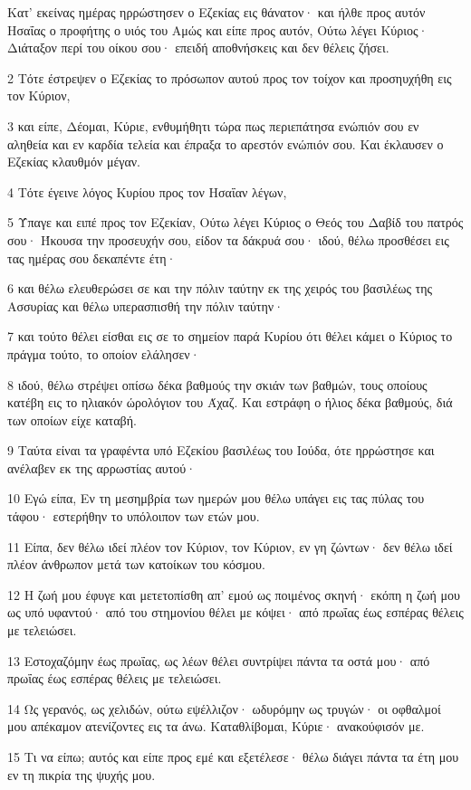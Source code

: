 \par Κατ' εκείνας ημέρας ηρρώστησεν ο Εζεκίας εις θάνατον· και ήλθε προς αυτόν Ησαΐας ο προφήτης ο υιός του Αμώς και είπε προς αυτόν, Ούτω λέγει Κύριος· Διάταξον περί του οίκου σου· επειδή αποθνήσκεις και δεν θέλεις ζήσει.
\par 2 Τότε έστρεψεν ο Εζεκίας το πρόσωπον αυτού προς τον τοίχον και προσηυχήθη εις τον Κύριον,
\par 3 και είπε, Δέομαι, Κύριε, ενθυμήθητι τώρα πως περιεπάτησα ενώπιόν σου εν αληθεία και εν καρδία τελεία και έπραξα το αρεστόν ενώπιόν σου. Και έκλαυσεν ο Εζεκίας κλαυθμόν μέγαν.
\par 4 Τότε έγεινε λόγος Κυρίου προς τον Ησαΐαν λέγων,
\par 5 Ύπαγε και ειπέ προς τον Εζεκίαν, Ούτω λέγει Κύριος ο Θεός του Δαβίδ του πατρός σου· Ήκουσα την προσευχήν σου, είδον τα δάκρυά σου· ιδού, θέλω προσθέσει εις τας ημέρας σου δεκαπέντε έτη·
\par 6 και θέλω ελευθερώσει σε και την πόλιν ταύτην εκ της χειρός του βασιλέως της Ασσυρίας και θέλω υπερασπισθή την πόλιν ταύτην·
\par 7 και τούτο θέλει είσθαι εις σε το σημείον παρά Κυρίου ότι θέλει κάμει ο Κύριος το πράγμα τούτο, το οποίον ελάλησεν·
\par 8 ιδού, θέλω στρέψει οπίσω δέκα βαθμούς την σκιάν των βαθμών, τους οποίους κατέβη εις το ηλιακόν ώρολόγιον του Άχαζ. Και εστράφη ο ήλιος δέκα βαθμούς, διά των οποίων είχε καταβή.
\par 9 Ταύτα είναι τα γραφέντα υπό Εζεκίου βασιλέως του Ιούδα, ότε ηρρώστησε και ανέλαβεν εκ της αρρωστίας αυτού·
\par 10 Εγώ είπα, Εν τη μεσημβρία των ημερών μου θέλω υπάγει εις τας πύλας του τάφου· εστερήθην το υπόλοιπον των ετών μου.
\par 11 Είπα, δεν θέλω ιδεί πλέον τον Κύριον, τον Κύριον, εν γη ζώντων· δεν θέλω ιδεί πλέον άνθρωπον μετά των κατοίκων του κόσμου.
\par 12 Η ζωή μου έφυγε και μετετοπίσθη απ' εμού ως ποιμένος σκηνή· εκόπη η ζωή μου ως υπό υφαντού· από του στημονίου θέλει με κόψει· από πρωΐας έως εσπέρας θέλεις με τελειώσει.
\par 13 Εστοχαζόμην έως πρωΐας, ως λέων θέλει συντρίψει πάντα τα οστά μου· από πρωΐας έως εσπέρας θέλεις με τελειώσει.
\par 14 Ως γερανός, ως χελιδών, ούτω εψέλλιζον· ωδυρόμην ως τρυγών· οι οφθαλμοί μου απέκαμον ατενίζοντες εις τα άνω. Καταθλίβομαι, Κύριε· ανακούφισόν με.
\par 15 Τι να είπω; αυτός και είπε προς εμέ και εξετέλεσε· θέλω διάγει πάντα τα έτη μου εν τη πικρία της ψυχής μου.

